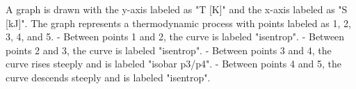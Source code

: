 A graph is drawn with the y-axis labeled as "T [K]" and the x-axis labeled as "S [kJ]". The graph represents a thermodynamic process with points labeled as 1, 2, 3, 4, and 5.  
- Between points 1 and 2, the curve is labeled "isentrop".  
- Between points 2 and 3, the curve is labeled "isentrop".  
- Between points 3 and 4, the curve rises steeply and is labeled "isobar p3/p4".  
- Between points 4 and 5, the curve descends steeply and is labeled "isentrop".